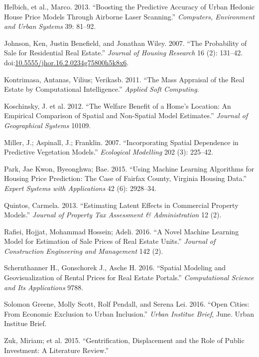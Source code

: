\documentclass[]{article}
\begin{document}
\hypertarget{ref-Helbich2013}{}
Helbich, et al., Marco. 2013. ``Boosting the Predictive Accuracy of
Urban Hedonic House Price Models Through Airborne Laser Scanning.''
\emph{Computers, Environment and Urban Systems} 39: 81--92.

\hypertarget{ref-Johnson2007}{}
Johnson, Ken, Justin Benefield, and Jonathan Wiley. 2007. ``The
Probability of Sale for Residential Real Estate.'' \emph{Journal of
Housing Research} 16 (2): 131--42.
doi:\href{https://doi.org/10.5555/jhor.16.2.0234g75800h5k8x6}{10.5555/jhor.16.2.0234g75800h5k8x6}.

\hypertarget{ref-Kontrimasa2011}{}
Kontrimasa, Antanas, Vilius; Verikasb. 2011. ``The Mass Appraisal of the
Real Estate by Computational Intelligence.'' \emph{Applied Soft
Computing}.

\hypertarget{ref-Koschinsky2012}{}
Koschinsky, J. et al. 2012. ``The Welfare Benefit of a Home's Location:
An Empirical Comparison of Spatial and Non-Spatial Model Estimates.''
\emph{Journal of Geographical Systems} 10109.

\hypertarget{ref-Miller2015}{}
Miller, J.; Aspinall, J.; Franklin. 2007. ``Incorporating Spatial
Dependence in Predictive Vegetation Models.'' \emph{Ecological
Modelling} 202 (3): 225--42.

\hypertarget{ref-Park2015}{}
Park, Jae Kwon, Byeonghwa; Bae. 2015. ``Using Machine Learning
Algorithms for Housing Price Prediction: The Case of Fairfax County,
Virginia Housing Data.'' \emph{Expert Systems with Applications} 42 (6):
2928--34.

\hypertarget{ref-Quintos2013}{}
Quintos, Carmela. 2013. ``Estimating Latent Effects in Commercial
Property Models.'' \emph{Journal of Property Tax Assessment \&
Administration} 12 (2).

\hypertarget{ref-Rafiei2016}{}
Rafiei, Hojjat, Mohammad Hossein; Adeli. 2016. ``A Novel Machine
Learning Model for Estimation of Sale Prices of Real Estate Units.''
\emph{Journal of Construction Engineering and Management} 142 (2).

\hypertarget{ref-Schernthanner2016}{}
Schernthanner H., Gonschorek J., Asche H. 2016. ``Spatial Modeling and
Geovisualization of Rental Prices for Real Estate Portals.''
\emph{Computational Science and Its Applications} 9788.

\hypertarget{ref-urban2016}{}
Solomon Greene, Molly Scott, Rolf Pendall, and Serena Lei. 2016. ``Open
Cities: From Economic Exclusion to Urban Inclusion.'' \emph{Urban
Institue Brief}, June. Urban Institue Brief.

\hypertarget{ref-Zuk2015}{}
Zuk, Miriam; et al. 2015. ``Gentrification, Displacement and the Role of
Public Investment: A Literature Review.''
\end{document}
